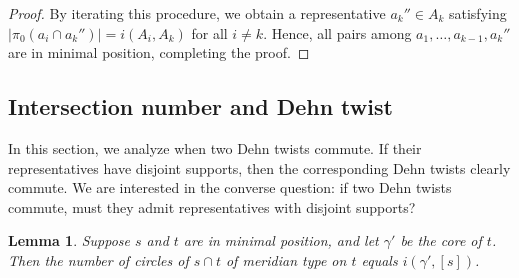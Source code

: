 \documentclass[12pt,a4paper]{amsart}
\numberwithin{equation}{section}
\theoremstyle{plain}
\newtheorem{lemma}[theorem]{Lemma}
\theoremstyle{definition}
\theoremstyle{remark}
\begin{document}
\begin{proof}
    \medskip
    By iterating this procedure, we obtain a representative \(a_k'' \in A_k\) satisfying  
    \(\lvert \pi_0(a_i \cap a_k'') \rvert = i(A_i, A_k)\) for all \(i \ne k\).  
    Hence, all pairs among \(a_1, \dots, a_{k-1}, a_k''\) are in minimal position, completing the proof.
\end{proof}


\subsection{Intersection number and Dehn twist}

In this section, we analyze when two Dehn twists commute.  
If their representatives have disjoint supports, then the corresponding Dehn twists clearly commute.
We are interested in the converse question: if two Dehn twists commute, must they admit representatives with disjoint supports?

\begin{lemma} \label{lem:meridian_count}
    Suppose $s$ and $t$ are in minimal position, and let $\gamma'$ be the core of $t$.
    Then the number of circles of $s \cap t$ of meridian type on $t$ equals $i(\gamma', [s])$.
\end{lemma}
\end{document}
